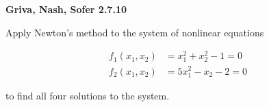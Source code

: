\textbf{Griva, Nash, Sofer 2.7.10}

Apply Newton's method to the system of nonlinear equations

\begin{align*}
  f_1(x_1, x_2) &= x_1^2 + x_2^2 - 1 = 0 \\
  f_2(x_1, x_2) &= 5 x_1^2 - x_2 - 2 = 0
\end{align*}

to find all four solutions to the system.

\begin{solution}
  \ \\
\end{solution}